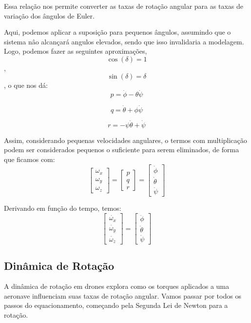 Essa relação nos permite converter as taxas de rotação angular para as taxas de variação dos ângulos de Euler.

Aqui, podemos aplicar a suposição para pequenos ângulos, assumindo que o sistema nâo alcançará angulos elevados, sendo que isso invalidaria a modelagem. Logo, podemos fazer as seguintes aproximações, \[ \cos(\delta) =1\] , \[ \sin(\delta) =\delta\], o que nos dá:
\[ p = \dot{\phi} - \theta\dot{\psi} \]

\[ q = \dot{\theta} + \phi\dot{\psi}\]

\[ r = - \psi\dot{\theta} + \dot{\psi} \]

Assim, considerando pequenas velocidades angulares, o termos com multiplicação podem ser considerados pequenos o suficiente para serem eliminados, de forma que ficamos com:
\[
	\begin{bmatrix}
		\omega_{x} \\
		\omega_{y} \\
		\omega_{z}
	\end{bmatrix}
	=
	\begin{bmatrix}
		p \\
		q \\
		r
	\end{bmatrix}
	=
	\begin{bmatrix}
		\dot{\phi}   \\
		\dot{\theta} \\
		\dot{\psi}
	\end{bmatrix}
\]

Derivando em função do tempo, temos:
\[
	\begin{bmatrix}
		\dot{\omega_{x}} \\
		\dot{\omega_{y}} \\
		\dot{\omega_{z}}
	\end{bmatrix}
	=
	\begin{bmatrix}
		\ddot{\phi}   \\
		\ddot{\theta} \\
		\ddot{\psi}
	\end{bmatrix}
\]



\subsection{Dinâmica de Rotação}

A dinâmica de rotação em drones explora como os torques aplicados a uma aeronave influenciam suas taxas de rotação angular. Vamos passar por todos os passos do equacionamento, começando pela Segunda Lei de Newton para a rotação.

